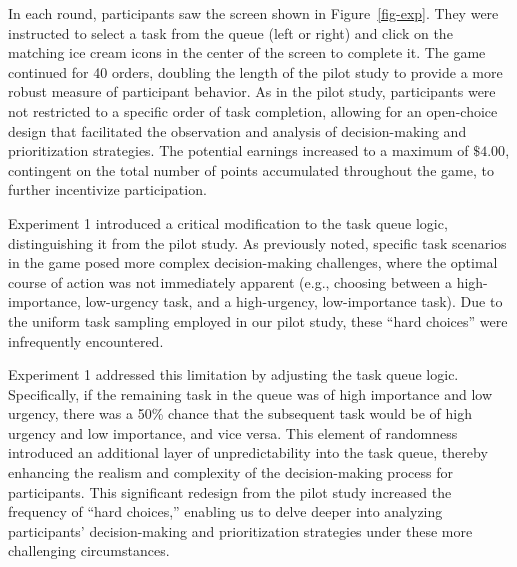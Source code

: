 \documentclass[
]{report}
\begin{document}
In each round, participants saw the screen shown in
Figure~\ref{fig-exp}. They were instructed to select a task from the
queue (left or right) and click on the matching ice cream icons in the
center of the screen to complete it. The game continued for 40 orders,
doubling the length of the pilot study to provide a more robust measure
of participant behavior. As in the pilot study, participants were not
restricted to a specific order of task completion, allowing for an
open-choice design that facilitated the observation and analysis of
decision-making and prioritization strategies. The potential earnings
increased to a maximum of \(\$4.00\), contingent on the total number of
points accumulated throughout the game, to further incentivize
participation.

Experiment 1 introduced a critical modification to the task queue logic,
distinguishing it from the pilot study. As previously noted, specific
task scenarios in the game posed more complex decision-making
challenges, where the optimal course of action was not immediately
apparent (e.g., choosing between a high-importance, low-urgency task,
and a high-urgency, low-importance task). Due to the uniform task
sampling employed in our pilot study, these ``hard choices'' were
infrequently encountered.

Experiment 1 addressed this limitation by adjusting the task queue
logic. Specifically, if the remaining task in the queue was of high
importance and low urgency, there was a 50\% chance that the subsequent
task would be of high urgency and low importance, and vice versa. This
element of randomness introduced an additional layer of unpredictability
into the task queue, thereby enhancing the realism and complexity of the
decision-making process for participants. This significant redesign from
the pilot study increased the frequency of ``hard choices,'' enabling us
to delve deeper into analyzing participants' decision-making and
prioritization strategies under these more challenging circumstances.
\end{document}
